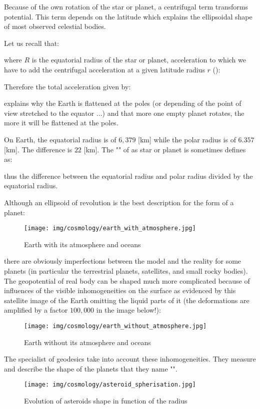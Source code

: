 	Because of the own rotation of the star or planet, a centrifugal term transforms potential. This term depends on the latitude which explains the ellipsoidal shape of most observed celestial bodies.
	
	Let us recall that:
	
	where $R$ is the equatorial radius of the star or planet, acceleration to which we have to add the centrifugal acceleration at a given latitude radius $r$ ():
	
	Therefore the total acceleration given by:
	
	explains why the Earth is flattened at the poles (or depending of the point of view stretched to the equator ...) and that more one empty planet rotates, the more it will be flattened at the poles.
	
	On Earth, the equatorial radius is of $6,379$ [km] while the polar radius is of $6.357$ [km]. The difference is $22$ [km]. The "" of as star or planet is sometimes defines as:
	
	thus the difference between the equatorial radius and polar radius divided by the equatorial radius.
	
	Although an ellipsoid of revolution is the best description for the form of a planet:
	\begin{figure}[H]
		\begin{center}
		\texttt{[image: img/cosmology/earth\_with\_atmosphere.jpg]}
		\end{center}	
		\caption{Earth with its atmosphere and oceans}
	\end{figure}
	there are obviously imperfections between the model and the reality for some planets (in particular the terrestrial planets, satellites, and small rocky bodies). The geopotential of real body can be shaped much more complicated because of influences of the visible inhomogeneities on the surface as evidenced by this satellite image of the Earth omitting the liquid parts of it (the deformations are amplified by a factor $100,000$ in the image below!):
	\begin{figure}[H]
		\begin{center}
		\texttt{[image: img/cosmology/earth\_without\_atmosphere.jpg]}
		\end{center}	
		\caption{Earth without its atmosphere and oceans}
	\end{figure}
	The specialist of geodesics take into account these inhomogeneities. They measure and describe the shape of the planets that they name "".
	\begin{figure}[H]
		\begin{center}
		\texttt{[image: img/cosmology/asteroid\_spherisation.jpg]}
		\end{center}	
		\caption{Evolution of asteroids shape in function of the radius}
	\end{figure}
	
